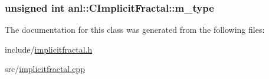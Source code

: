 \label{classanl_1_1CImplicitFractal_ad9688497eb2e4ff139d17bea34d7c5f4}
\hypertarget{classanl_1_1CImplicitFractal_a9cb56d55cc44609583ad2baca10e7173}{
\subsubsection[{m\_\-type}]{\setlength{\rightskip}{0pt plus 5cm}unsigned int {\bf anl::CImplicitFractal::m\_\-type}}}
\label{classanl_1_1CImplicitFractal_a9cb56d55cc44609583ad2baca10e7173}


The documentation for this class was generated from the following files:\begin{DoxyCompactItemize}
\item 
include/\hyperlink{implicitfractal_8h}{implicitfractal.h}\item 
src/\hyperlink{implicitfractal_8cpp}{implicitfractal.cpp}\end{DoxyCompactItemize}
